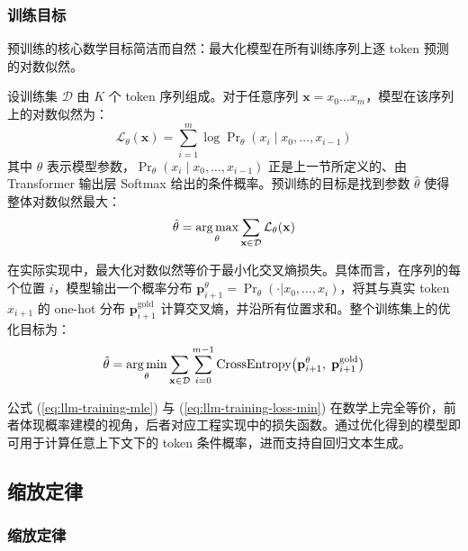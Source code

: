\subsubsection{训练目标}

预训练的核心数学目标简洁而自然：最大化模型在所有训练序列上逐 token 预测的对数似然。

设训练集 $\mathcal{D}$ 由 $K$ 个 token 序列组成。对于任意序列 $\mathbf{x} = x_0\ldots x_m$，模型在该序列上的对数似然为：
\begin{equation}
  \mathcal{L}_{\theta}(\mathbf{x}) = \sum_{i=1}^{m} \log \Pr\nolimits_{\theta}(x_i \mid x_0,\dots,x_{i-1})
  \label{eq:llm-training-loss}
\end{equation}
其中 $\theta$ 表示模型参数，$\Pr_{\theta}(x_i \mid x_0,\dots,x_{i-1})$ 正是上一节所定义的、由 Transformer 输出层 Softmax 给出的条件概率。预训练的目标是找到参数 $\hat{\theta}$ 使得整体对数似然最大：
\begin{equation}
  \hat{\theta} = \operatorname*{arg\,max}_{\theta} \sum_{\mathbf{x} \in \mathcal{D}} \mathcal{L}_{\theta}(\mathbf{x})
  \label{eq:llm-training-mle}
\end{equation}

在实际实现中，最大化对数似然等价于最小化交叉熵损失。具体而言，在序列的每个位置 $i$，模型输出一个概率分布 $\mathbf{p}_{i+1}^{\theta} = \Pr_{\theta}(\cdot|x_0,\dots,x_i)$，将其与真实 token $x_{i+1}$ 的 one-hot 分布 $\mathbf{p}_{i+1}^{\mathrm{gold}}$ 计算交叉熵，并沿所有位置求和。整个训练集上的优化目标为：
\begin{equation}
  \hat{\theta} = \operatorname*{arg\,min}_{\theta} \sum_{\mathbf{x} \in \mathcal{D}} \sum_{i=0}^{m-1} \mathrm{CrossEntropy}\big(\mathbf{p}_{i+1}^{\theta},\; \mathbf{p}_{i+1}^{\mathrm{gold}}\big)
  \label{eq:llm-training-loss-min}
\end{equation}

公式 (\ref{eq:llm-training-mle}) 与 (\ref{eq:llm-training-loss-min}) 在数学上完全等价，前者体现概率建模的视角，后者对应工程实现中的损失函数。通过优化得到的模型即可用于计算任意上下文下的 token 条件概率，进而支持自回归文本生成。


\subsection{缩放定律}
\label{sec:llm-training-at-scale}

\subsubsection{缩放定律}

